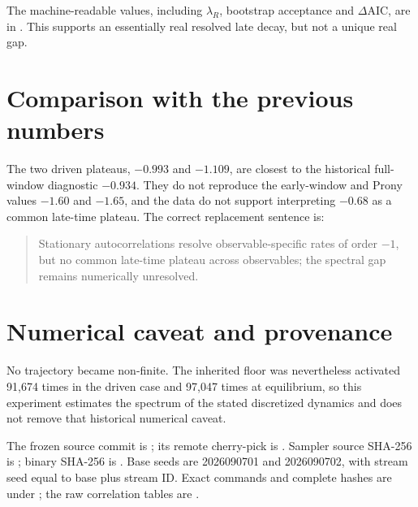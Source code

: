 \documentclass[11pt]{article}
\begin{document}
The machine-readable values, including $\lambda_R$, bootstrap acceptance and
$\Delta\mathrm{AIC}$, are in .  This
supports an essentially real resolved late decay, but not a unique real gap.

\section*{Comparison with the previous numbers}
The two driven plateaus, $-0.993$ and $-1.109$, are closest to the historical
full-window diagnostic $-0.934$.  They do not reproduce the early-window and
Prony values $-1.60$ and $-1.65$, and the data do not support interpreting
$-0.68$ as a common late-time plateau.  The correct replacement sentence is:
\begin{quote}
Stationary autocorrelations resolve observable-specific rates of order $-1$,
but no common late-time plateau across observables; the spectral gap remains
numerically unresolved.
\end{quote}

\section*{Numerical caveat and provenance}
No trajectory became non-finite.  The inherited floor was nevertheless
activated 91,674 times in the driven case and 97,047 times at equilibrium, so
this experiment estimates the spectrum of the stated discretized dynamics and
does not remove that historical numerical caveat.

The frozen source commit is
; its remote cherry-pick is
.  Sampler source SHA-256 is
;
binary SHA-256 is
.
Base seeds are 2026090701 and 2026090702, with stream seed equal to base plus
stream ID.  Exact commands and complete hashes are under ;
the raw correlation tables are .
\end{document}
